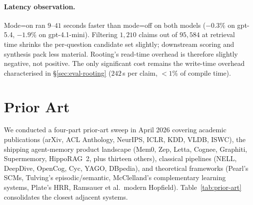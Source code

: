 \documentclass[10pt,a4paper]{article}
\begin{document}
\paragraph{Latency observation.}
Mode=on ran $9$--$41$ seconds faster than mode=off on both models
($-0.3\%$ on gpt-5.4, $-1.9\%$ on gpt-4.1-mini). Filtering $1{,}210$
claims out of $95{,}584$ at retrieval time shrinks the per-question
candidate set slightly; downstream scoring and synthesis pack less
material. Rooting's read-time overhead is therefore slightly negative,
not positive. The only significant cost remains the write-time
overhead characterised in \S\ref{sec:eval-rooting} ($242$\,\textmu s
per claim, $<1\%$ of compile time).

\section{Prior Art}
\label{sec:prior-art}

We conducted a four-part prior-art sweep in April 2026 covering academic
publications (arXiv, ACL Anthology, NeurIPS, ICLR, KDD, VLDB, ISWC), the
shipping agent-memory product landscape (Mem0, Zep, Letta, Cognee, Graphiti,
Supermemory, HippoRAG~2, plus thirteen others), classical pipelines (NELL,
DeepDive, OpenCog, Cyc, YAGO, DBpedia), and theoretical frameworks
(Pearl's SCMs, Tulving's episodic/semantic, McClelland's complementary
learning systems, Plate's HRR, Ramsauer et al.\ modern Hopfield).
Table~\ref{tab:prior-art} consolidates the closest adjacent systems.
\end{document}
